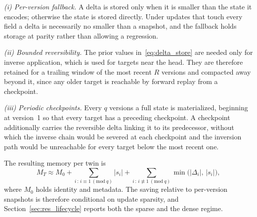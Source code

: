 \documentclass[final,5p,times,twocolumn]{elsarticle}
\begin{document}
\emph{(i) Per-version fallback.} A delta is stored only when it is smaller than the state it encodes; otherwise the state is stored directly. Under updates that touch every field a delta is necessarily no smaller than a snapshot, and the fallback holds storage at parity rather than allowing a regression.

\emph{(ii) Bounded reversibility.} The prior values in~\eqref{eq:delta_store} are needed only for inverse application, which is used for targets near the head. They are therefore retained for a trailing window of the most recent $R$ versions and compacted away beyond it, since any older target is reachable by forward replay from a checkpoint.

\emph{(iii) Periodic checkpoints.} Every $q$ versions a full state is materialized, beginning at version~1 so that every target has a preceding checkpoint. A checkpoint additionally carries the reversible delta linking it to its predecessor, without which the inverse chain would be severed at each checkpoint and the inversion path would be unreachable for every target below the most recent one.

The resulting memory per twin is
\begin{equation}
  M_T \approx M_0
  + \sum_{i\,:\,i\equiv 1\ (\mathrm{mod}\ q)} |s_i|
  + \sum_{i\,:\,i\not\equiv 1\ (\mathrm{mod}\ q)} \min\!\big(|\Delta_i|,\,|s_i|\big),
  \label{eq:memory}
\end{equation}
where $M_0$ holds identity and metadata. The saving relative to per-version snapshots is therefore conditional on update sparsity, and Section~\ref{sec:res_lifecycle} reports both the sparse and the dense regime.
\end{document}
